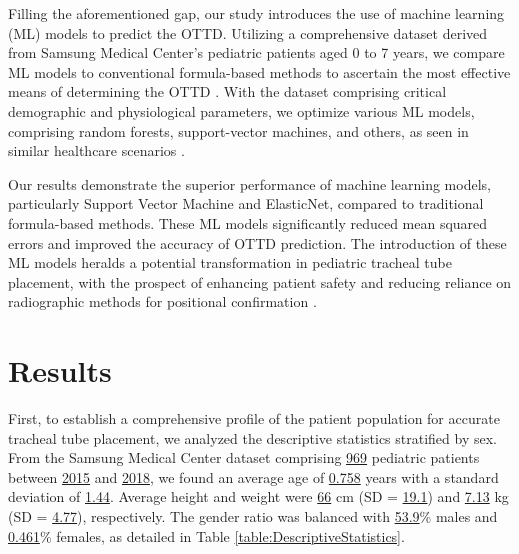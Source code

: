 \documentclass[11pt]{article}
\begin{document}
Filling the aforementioned gap, our study introduces the use of machine learning (ML) models to predict the OTTD. Utilizing a comprehensive dataset derived from Samsung Medical Center's pediatric patients aged 0 to 7 years, we compare ML models to conventional formula-based methods to ascertain the most effective means of determining the OTTD \cite{Ingelse2017EarlyFO, Gupta2015RelationshipOE}. With the dataset comprising critical demographic and physiological parameters, we optimize various ML models, comprising random forests, support-vector machines, and others, as seen in similar healthcare scenarios \cite{Xia2022DevelopmentAV}. 

Our results demonstrate the superior performance of machine learning models, particularly Support Vector Machine and ElasticNet, compared to traditional formula-based methods. These ML models significantly reduced mean squared errors and improved the accuracy of OTTD prediction. The introduction of these ML models heralds a potential transformation in pediatric tracheal tube placement, with the prospect of enhancing patient safety and reducing reliance on radiographic methods for positional confirmation \cite{Xia2022DevelopmentAV}.

\section*{Results}

First, to establish a comprehensive profile of the patient population for accurate tracheal tube placement, we analyzed the descriptive statistics stratified by sex. From the Samsung Medical Center dataset comprising \hyperlink{R0a}{969} pediatric patients between \hyperlink{S1b}{2015} and \hyperlink{S1c}{2018}, we found an average age of \hyperlink{A0b}{0.758} years with a standard deviation of \hyperlink{A1b}{1.44}. Average height and weight were \hyperlink{A0c}{66} cm (SD = \hyperlink{A1c}{19.1}) and \hyperlink{A0d}{7.13} kg (SD = \hyperlink{A1d}{4.77}), respectively. The gender ratio was balanced with \hyperlink{A0a}{53.9}\% males and \hyperlink{results0}{0.461}\% females, as detailed in Table \ref{table:DescriptiveStatistics}.
\end{document}

